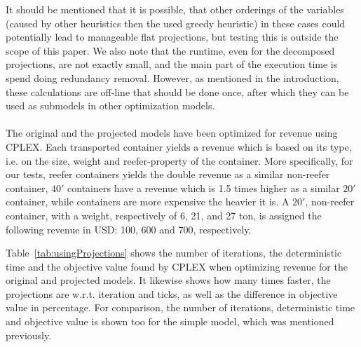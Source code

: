It should be mentioned that it is possible, that other orderings of the variables (caused by other heuristics then the used greedy heuristic) in these cases could potentially lead to manageable flat projections, but testing this is outside the scope of this paper.  
We also note that the runtime, even for the decomposed projections, are not exactly small, and the main part of the execution time is spend doing redundancy removal. However, as mentioned in the introduction, these calculations are off-line that should be done once, after which they can be used as submodels in other optimization models.  
\\\\
The original and the projected models have been optimized for revenue using CPLEX. 
Each transported container yields a revenue which is based on its type, i.e. on the size, weight and reefer-property of the container. More specifically, for our tests, reefer containers yields the double revenue as a similar non-reefer container, $40'$ containers have a revenue which is 1.5 times higher as a similar $20'$ container, while containers are more expensive the heavier it is. A $20'$, non-reefer container, with a weight, respectively of 6, 21, and 27 ton, is assigned the following revenue in USD: 100, 600 and 700, respectively.   

Table~\ref{tab:usingProjections} shows the number of iterations, the deterministic time and the objective value found by CPLEX when optimizing revenue for the original and projected models. It likewise shows how many times faster, the projections are w.r.t. iteration and ticks, as well as the difference in objective value in percentage. For comparison, the number of iterations, deterministic time and objective value is shown too for the simple model, which was mentioned previously.

